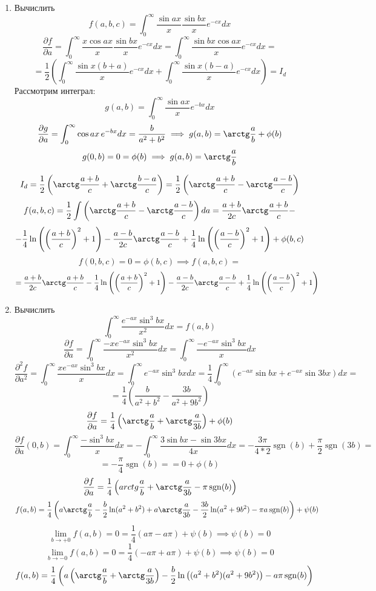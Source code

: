 \documentclass{article}
\DeclareMathOperator{\sgn}{sgn}
\begin{document}
\begin{large}
\begin{enumerate}
\item Вычислить
$$ f(a,b,c) = \int_0^\infty \frac{\sin ax}{x} \frac{\sin bx}{x} e^{-cx} dx $$
$$ \frac{\partial f}{\partial a} = \int_0^\infty \frac{x\cos ax}{x} \frac{\sin bx}{x} e^{-cx} dx = \int_0^\infty \frac{\sin bx \cos ax}{x} e^{-cx} dx =$$
$$= \frac{1}{2} \left( \int_0^\infty \frac{\sin x(b+a)}{x} e^{-cx} dx + \int_0^\infty \frac{\sin x(b-a)}{x} e^{-cx} dx \right) = I_d$$
Рассмотрим интеграл:
$$ g(a,b) = \int_0^\infty \frac{\sin ax}{x} e^{-bx} dx $$
$$ \frac{\partial g}{\partial a} = \int_0^\infty \cos ax \, e^{-bx} dx = \frac{b}{a^2 + b^2} \implies g(a,b) = \arctg \frac{a}{b} + \phi(b) $$
$$ g(0,b) = 0 = \phi(b) \implies g(a,b) = \arctg \frac{a}{b} $$

$$ I_d = \frac{1}{2} \left( \arctg \frac{a+b}{c} + \arctg \frac{b-a}{c} \right) = \frac{1}{2} \left( \arctg \frac{a+b}{c} - \arctg \frac{a-b}{c} \right) $$
$$ f(a,b,c) = \frac{1}{2} \int \left( \arctg \frac{a+b}{c} - \arctg \frac{a-b}{c} \right) da = \frac{a+b}{2c} \arctg \frac{a+b}{c} - $$
$$ - \frac{1}{4} \ln \left(\left(\frac{a+b}{c}\right)^2 + 1 \right) - \frac{a-b}{2c} \arctg \frac{a-b}{c} + \frac{1}{4} \ln \left(\left(\frac{a-b}{c}\right)^2 + 1 \right) + \phi(b,c)$$
$$ f(0,b,c) = 0 = \phi(b,c) \implies f(a,b,c) =$$
$$ = \frac{a+b}{2c} \arctg \frac{a+b}{c} - \frac{1}{4} \ln \left(\left(\frac{a+b}{c}\right)^2 + 1 \right) - \frac{a-b}{2c} \arctg \frac{a-b}{c} + \frac{1}{4} \ln \left(\left(\frac{a-b}{c}\right)^2 + 1 \right) $$

\item Вычислить
$$ \int_0^\infty \frac{e^{-ax} \sin^3 bx}{x^2} dx = f(a,b) $$
$$ \frac{\partial f}{\partial a} = \int_0^\infty \frac{-xe^{-ax} \sin^3 bx}{x^2} dx = \int_0^\infty \frac{-e^{-ax} \sin^3 bx}{x} dx $$
$$ \frac{\partial^2 f}{\partial a^2} = \int_0^\infty \frac{xe^{-ax} \sin^3 bx}{x} dx = \int_0^\infty e^{-ax} \sin^3 bx dx = \frac{1}{4} \int_0^\infty\left( e^{-ax} \sin bx + e^{-ax} \sin 3bx  \right) dx = $$
$$ = \frac{1}{4} \left( \frac{b}{a^2 + b^2} - \frac{3b}{a^2 + 9b^2} \right) $$
$$ \frac{\partial f}{\partial a} = \frac{1}{4} \left( \arctg \frac{a}{b} + \arctg \frac{a}{3b} \right) + \phi(b) $$
$$ \frac{\partial f}{\partial a}(0,b) = \int_0^\infty \frac{-\sin^3 bx}{x} dx = -\int_0^\infty \frac{3 \sin bx - \sin 3bx}{4x} dx = -\frac{3\pi}{4*2} \sgn(b) + \frac{\pi}{2}\sgn(3b) = $$
$$ = -\frac{\pi}{4}\sgn(b) == 0 + \phi(b) $$
$$ \frac{\partial f}{\partial a} = \frac{1}{4} \left( arctg \frac{a}{b} + \arctg \frac{a}{3b} - \pi\sgn(b) \right) $$
$$ f(a,b) = \frac{1}{4} \left( a \arctg \frac{a}{b} - \frac{b}{2} \ln(a^2+b^2) + a \arctg \frac{a}{3b} - \frac{3b}{2} \ln(a^2+9b^2) - \pi a\sgn(b) \right) + \psi(b) $$
$$ \lim_{b\to+0} f(a,b) = 0 = \frac{1}{4}\left( a\pi-a\pi \right) + \psi(b) \implies \psi(b) = 0 $$
$$ \lim_{b\to-0} f(a,b) = 0 = \frac{1}{4}\left( -a\pi+a\pi \right) + \psi(b) \implies \psi(b) = 0 $$
$$ f(a,b) = \frac{1}{4}\left( a\left( \arctg \frac{a}{b} + \arctg \frac{a}{3b} \right) - \frac{b}{2}\ln \left((a^2 + b^2)(a^2 + 9b^2)\right) - a\pi\sgn(b)\right)$$


\end{enumerate}
\end{large}
\end{document}
